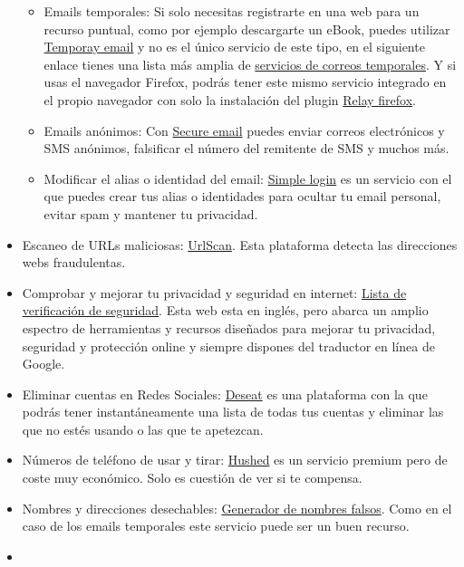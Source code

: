 \documentclass[
  spanish,
  a4paper,
  openany]{book}
\begin{document}
\begin{itemize}
  \begin{itemize}
  \item
    Emails temporales: Si solo necesitas registrarte en una web para un recurso puntual, como por ejemplo descargarte un eBook, puedes utilizar \href{https://temp-mail.org/es/}{Temporay email} y no es el único servicio de este tipo, en el siguiente enlace tienes una lista más amplia de \href{https://www.genbeta.com/correo/7-servicios-de-email-temporales-para-evitar-spam-y-otros-problemas}{servicios de correos temporales}. Y si usas el navegador Firefox, podrás tener este mismo servicio integrado en el propio navegador con solo la instalación del plugin \href{https://relay.firefox.com}{Relay firefox}.
  \item
    Emails anónimos: Con \href{https://www.secure-email.org/index.php}{Secure email} puedes enviar correos electrónicos y SMS anónimos, falsificar el número del remitente de SMS y muchos más.
  \item
    Modificar el alias o identidad del email: \href{https://simplelogin.io/}{Simple login} es un servicio con el que puedes crear tus alias o identidades para ocultar tu email personal, evitar spam y mantener tu privacidad.
  \end{itemize}
\item
  Escaneo de URLs maliciosas: \href{https://urlscan.io/}{UrlScan}. Esta plataforma detecta las direcciones webs fraudulentas.
\item
  Comprobar y mejorar tu privacidad y seguridad en internet: \href{https://securitycheckli.st/}{Lista de verificación de seguridad}. Esta web esta en inglés, pero abarca un amplio espectro de herramientas y recursos diseñados para mejorar tu privacidad, seguridad y protección online y siempre dispones del traductor en línea de Google.
\item
  Eliminar cuentas en Redes Sociales: \href{https://www.deseat.me/}{Deseat} es una plataforma con la que podrás tener instantáneamente una lista de todas tus cuentas y eliminar las que no estés usando o las que te apetezcan.
\item
  Números de teléfono de usar y tirar: \href{https://hushed.com}{Hushed} es un servicio premium pero de coste muy económico. Solo es cuestión de ver si te compensa.
\item
  Nombres y direcciones desechables: \href{https://www.fakenamegenerator.com}{Generador de nombres falsos}. Como en el caso de los emails temporales este servicio puede ser un buen recurso.
\item

\end{itemize}
\end{document}

